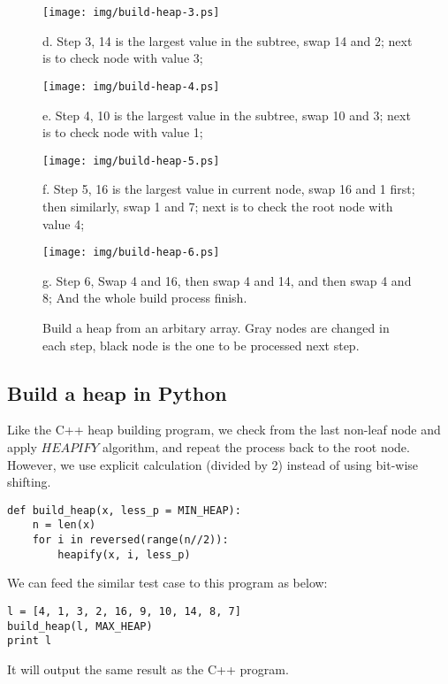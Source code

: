 \documentclass{article}
\begin{document}
\begin{figure}[htbp]
  \begin{center}
    \texttt{[image: img/build-heap-3.ps]}

    d. Step 3, 14 is the largest value in the subtree, swap 14 and 2; next is to check
node with value 3;

    \texttt{[image: img/build-heap-4.ps]}

    e. Step 4, 10 is the largest value in the subtree, swap 10 and 3; next is to check
node with value 1;

    \texttt{[image: img/build-heap-5.ps]}

    f. Step 5, 16 is the largest value in current node, swap 16 and 1 first; then
similarly, swap 1 and 7; next is to check the root node with value 4;

    \texttt{[image: img/build-heap-6.ps]}

    g. Step 6, Swap 4 and 16, then swap 4 and 14, and then swap 4 and 8; 
And the whole build process finish.

    \caption{Build a heap from an arbitary array. Gray nodes are changed in each step,
black node is the one to be processed next step.} \label{fig:build-heap-2}
  \end{center}
\end{figure}


\subsection*{Build a heap in Python}

Like the C++ heap building program, we check from the last non-leaf
node and apply $HEAPIFY$ algorithm, and repeat the process back to
the root node. However, we use explicit calculation (divided by 2)
instead of using bit-wise shifting.

\lstset{language=Python}
\begin{lstlisting}
def build_heap(x, less_p = MIN_HEAP):
    n = len(x)
    for i in reversed(range(n//2)):
        heapify(x, i, less_p)
\end{lstlisting}

We can feed the similar test case to this program as below:

\begin{lstlisting}
l = [4, 1, 3, 2, 16, 9, 10, 14, 8, 7]
build_heap(l, MAX_HEAP)
print l
\end{lstlisting}

It will output the same result as the C++ program.
\end{document}
